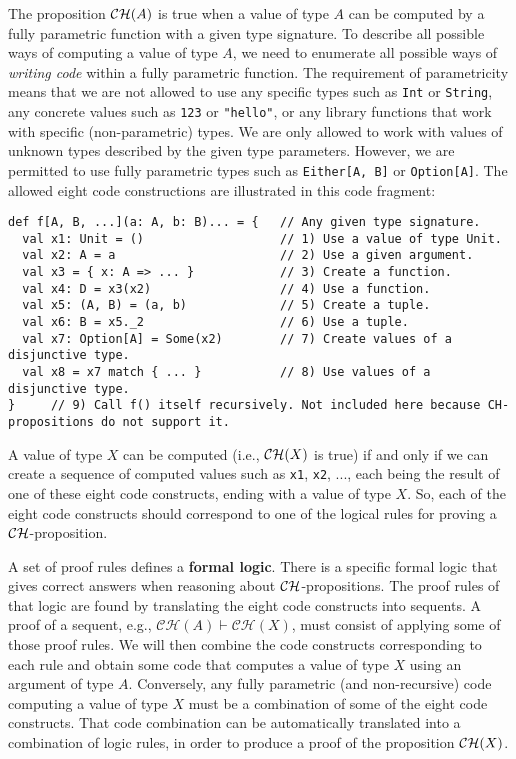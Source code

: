 The proposition ${\cal CH}(A)$ is true when a value of type $A$
can be computed by a fully parametric function with a given type signature.
To describe all possible ways of computing a value of type $A$, we
need to enumerate all possible ways of \emph{writing code} within
a fully parametric function. The requirement of parametricity means
that we are not allowed to use any specific types such as \lstinline!Int!
or \lstinline!String!, any concrete values such as \lstinline!123!
or \lstinline!"hello"!, or any library functions that work with specific
(non-parametric) types. We are only allowed to work with values of
unknown types described by the given type parameters. However, we
are permitted to use fully parametric types such as \lstinline!Either[A, B]!
or \lstinline!Option[A]!. The allowed eight code constructions
are illustrated in this code fragment:
\begin{lstlisting}
def f[A, B, ...](a: A, b: B)... = {   // Any given type signature.
  val x1: Unit = ()                   // 1) Use a value of type Unit.
  val x2: A = a                       // 2) Use a given argument.
  val x3 = { x: A => ... }            // 3) Create a function.
  val x4: D = x3(x2)                  // 4) Use a function.
  val x5: (A, B) = (a, b)             // 5) Create a tuple.
  val x6: B = x5._2                   // 6) Use a tuple.
  val x7: Option[A] = Some(x2)        // 7) Create values of a disjunctive type.
  val x8 = x7 match { ... }           // 8) Use values of a disjunctive type.
}     // 9) Call f() itself recursively. Not included here because CH-propositions do not support it.
\end{lstlisting}
A value of type $X$ can be computed (i.e., ${\cal CH}(X)$ is true)
if and only if we can create a sequence of computed values such as
\lstinline!x1!, \lstinline!x2!, ..., each being the result of one
of these eight code constructs, ending with a value of type $X$.
So, each of the eight code constructs should correspond to one of
the logical rules for proving a ${\cal CH}$-proposition.

A set of proof rules defines a \textbf{formal logic}.
There is a specific formal logic that gives correct answers when reasoning
about ${\cal CH}$-propositions. The proof rules of that logic are
found by translating the eight code constructs into sequents. A proof
of a sequent, e.g., $\mathcal{CH}(A)\vdash\mathcal{CH}(X)$, must
consist of applying some of those proof rules. We will then combine
the code constructs corresponding to each rule and obtain some code
that computes a value of type $X$ using an argument of type $A$.
Conversely, any fully parametric (and non-recursive) code computing
a value of type $X$ must be a combination of some of the eight code
constructs. That code combination
can be automatically translated into a combination of logic rules,
in order to produce a proof of the proposition ${\cal CH}(X)$.

